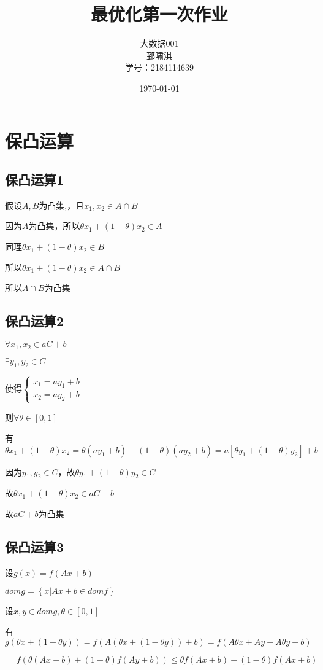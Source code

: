 \documentclass[12pt, a4paper, oneside, fontset=windows]{ctexart}
\title{\textbf{最优化第一次作业}}
\author{大数据001\\郅啸淇\\学号：2184114639}
\date{\today}
\begin{document}
\maketitle
\newpage
\tableofcontents
\newpage
\section{保凸运算}
\subsection{保凸运算1}
假设$A,B$为凸集,，且$x_{1},x_{2}\in A\cap B$

因为$A$为凸集，所以$\theta x_{1} + (1-\theta)x_{2} \in A$

同理$\theta x_{1} + (1-\theta)x_{2} \in B$

所以$\theta x_{1} + (1-\theta)x_{2} \in A\cap B$

所以$A\cap B$为凸集
\subsection{保凸运算2}
$\forall x_{1}, x_{2} \in aC + b$

$\exists y_{1},y_{2} \in C$

使得$\left\{\begin{matrix}
    x_{1} = ay_{1}+b\\ 
    x_{2} = ay_{2} + b 
   \end{matrix}\right.$

则$\forall \theta \in [0,1]$

有$\theta x_{1}+ (1-\theta)x_{2} = \theta(ay_{1}+b) + (1 - \theta)(ay_{2} + b) = a[\theta y_{1} + (1-\theta)y_{2}]+b$

因为$y_{1},y_{2} \in C$，故$\theta y_{1} +(1-\theta)y_{2} \in C$

故$\theta x_{1} + (1 - \theta)x_{2} \in aC + b$

故$aC+b$为凸集

\subsection{保凸运算3}
设$g(x) = f(Ax + b)$

$dom g = \left \{ x|Ax +b \in dom f \right \}$

设$x,y\in dom g, \theta \in [0,1]$

有$g(\theta x +(1 - \theta y)) = f(A(\theta x + (1- \theta y))+ b) = f(A\theta x + Ay - A\theta y + b)$

$=f(\theta (Ax + b) + (1-\theta)f(Ay + b)) \leq \theta f(Ax+b) + (1-\theta) f(Ax+b) $
\end{document}
